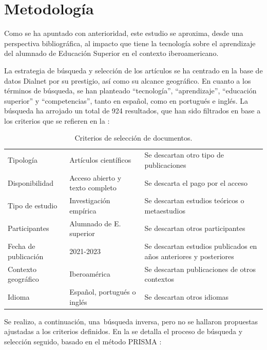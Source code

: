 \section{Metodología}\label{sec-metodología}

Como se ha apuntado con anterioridad, este estudio se aproxima, desde
una perspectiva bibliográfica, al impacto que tiene la tecnología sobre
el aprendizaje del alumnado de Educación Superior en el contexto
iberoamericano.

La estrategia de búsqueda y selección de los artículos se ha centrado en
la base de datos Dialnet por su prestigio, así como su alcance
geográfico. En cuanto a los términos de búsqueda, se han planteado
\enquote{tecnología}, \enquote{aprendizaje}, \enquote{educación superior} y
\enquote{competencias}, tanto en español, como en portugués e inglés. La
búsqueda ha arrojado un total de 924 resultados, que han sido filtrados
en base a los criterios que se refieren en la :

\begin{table}[h!]
\caption{Criterios de selección de documentos.}
\label{tab-01}
\centering
\begin{tabular}{l|lp{5cm}}
Tipología & Artículos científicos& Se descartan otro tipo de publicaciones \\
Disponibilidad & Acceso abierto y texto completo & Se descarta el pago por el acceso\\
Tipo de estudio & Investigación empírica & Se descartan estudios teóricos o metaestudios\\
Participantes & Alumnado de E. superior & Se descartan otros participantes\\
Fecha de publicación & 2021-2023 & Se descartan estudios publicados en años anteriores y posteriores\\
Contexto geográfico & Iberoamérica & Se descartan publicaciones de otros contextos\\
Idioma & Español, portugués o inglés & Se descartan otros idiomas\\
\end{tabular}
\end{table}

Se realizo, a continuación, una~búsqueda inversa, pero no se hallaron
propuestas ajustadas a los criterios definidos. En la  se
detalla el proceso de búsqueda y selección seguido, basado en el método
PRISMA \cite{urrutia2010}:


